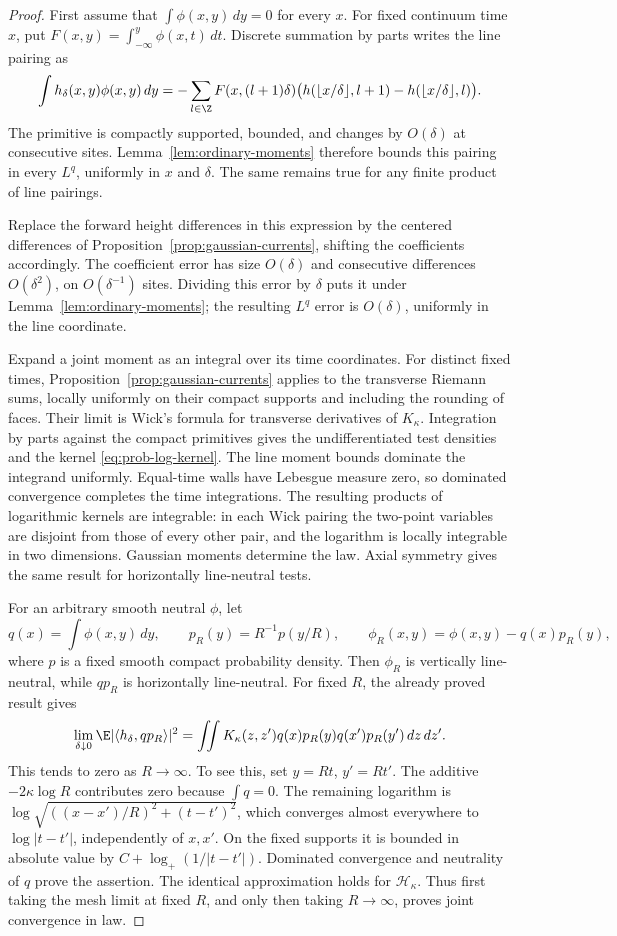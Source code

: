 \begin{proof}
First assume that \(\int\phi(x,y)\,dy=0\) for every \(x\).
For fixed continuum time \(x\), put
\(F(x,y)=\int_{-\infty}^y\phi(x,t)\,dt\).
Discrete summation by parts writes the line pairing as
\[
 \int h_\delta(x,y)\phi(x,y)\,dy
 =-\sum_{l\in\Z}F(x,(l+1)\delta)
       \bigl(h(\lfloor x/\delta\rfloor,l+1)
             -h(\lfloor x/\delta\rfloor,l)\bigr).
\]
The primitive is compactly supported, bounded, and changes by \(O(\delta)\)
at consecutive sites. Lemma~\ref{lem:ordinary-moments} therefore bounds
this pairing in every \(L^q\), uniformly in \(x\) and \(\delta\).
The same remains true for any finite product of line pairings.

Replace the forward height differences in this expression by the
centered differences of Proposition~\ref{prop:gaussian-currents}, shifting
the coefficients accordingly. The coefficient error has size
\(O(\delta)\) and consecutive differences \(O(\delta^2)\), on
\(O(\delta^{-1})\) sites. Dividing this error by \(\delta\) puts it
under Lemma~\ref{lem:ordinary-moments}; the resulting \(L^q\) error is
\(O(\delta)\), uniformly in the line coordinate.

Expand a joint moment as an integral over its time coordinates.
For distinct fixed times, Proposition~\ref{prop:gaussian-currents}
applies to the transverse Riemann sums, locally uniformly on their
compact supports and including the rounding of faces. Their limit is
Wick's formula for transverse derivatives of \(K_\kappa\).
Integration by parts against the compact primitives gives the
undifferentiated test densities and the kernel
\eqref{eq:prob-log-kernel}. The line moment bounds dominate the integrand
uniformly. Equal-time walls have Lebesgue measure zero, so dominated
convergence completes the time integrations. The resulting products of
logarithmic kernels are integrable: in each Wick pairing the two-point
variables are disjoint from those of every other pair, and the logarithm
is locally integrable in two dimensions. Gaussian moments determine the
law. Axial symmetry gives the same result for horizontally line-neutral
tests.

For an arbitrary smooth neutral \(\phi\), let
\[
 q(x)=\int\phi(x,y)\,dy,\qquad
 p_R(y)=R^{-1}p(y/R),\qquad
 \phi_R(x,y)=\phi(x,y)-q(x)p_R(y),
\]
where \(p\) is a fixed smooth compact probability density.
Then \(\phi_R\) is vertically line-neutral, while \(q p_R\) is
horizontally line-neutral. For fixed \(R\), the already proved result
gives
\[
 \lim_{\delta\downarrow0}\E|\langle h_\delta,q p_R\rangle|^2
 =\iint K_\kappa(z,z')q(x)p_R(y)q(x')p_R(y')\,dz\,dz'.
\]
This tends to zero as \(R\to\infty\). To see this, set
\(y=Rt\), \(y'=Rt'\). The additive \(-2\kappa\log R\) contributes
zero because \(\int q=0\). The remaining logarithm is
\(\log\sqrt{((x-x')/R)^2+(t-t')^2}\), which converges almost everywhere
to \(\log|t-t'|\), independently of \(x,x'\).
On the fixed supports it is bounded in absolute value by
\(C+\log_+(1/|t-t'|)\). Dominated convergence and neutrality of \(q\)
prove the assertion. The identical approximation holds for
\(\mathcal H_\kappa\). Thus first taking the mesh limit at fixed \(R\),
and only then taking \(R\to\infty\), proves joint convergence in law.


\end{proof}
